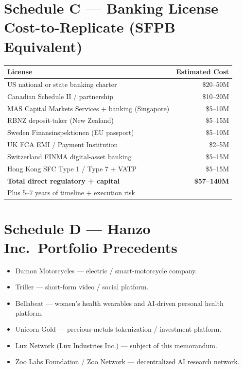 \documentclass[11pt,letterpaper]{article}
\begin{document}
\section*{Schedule C --- Banking License Cost-to-Replicate (SFPB
Equivalent)}

\begin{center}
\begin{tabular}{lr}
\toprule
\textbf{License} & \textbf{Estimated Cost} \\
\midrule
US national or state banking charter & \$20--50M \\
Canadian Schedule II / partnership & \$10--20M \\
MAS Capital Markets Services + banking (Singapore) & \$5--10M \\
RBNZ deposit-taker (New Zealand) & \$5--15M \\
Sweden Finansinspektionen (EU passport) & \$5--10M \\
UK FCA EMI / Payment Institution & \$2--5M \\
Switzerland FINMA digital-asset banking & \$5--15M \\
Hong Kong SFC Type 1 / Type 7 + VATP & \$5--15M \\
\midrule
\textbf{Total direct regulatory + capital} & \textbf{\$57--140M} \\
Plus 5--7 years of timeline + execution risk & \\
\bottomrule
\end{tabular}
\end{center}

\section*{Schedule D --- Hanzo Inc.\ Portfolio Precedents}

\begin{itemize}[leftmargin=1.5em,itemsep=0.1em]
\item Damon Motorcycles --- electric / smart-motorcycle company.
\item Triller --- short-form video / social platform.
\item Bellabeat --- women's health wearables and AI-driven personal
health platform.
\item Unicorn Gold --- precious-metals tokenization / investment
platform.
\item Lux Network (Lux Industries Inc.) --- subject of this memorandum.
\item Zoo Labs Foundation / Zoo Network --- decentralized AI research
network.
\end{itemize}
\end{document}
